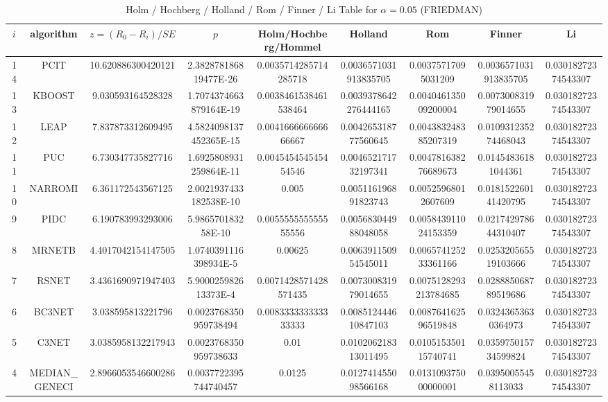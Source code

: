 \documentclass[a4paper,10pt]{article}
\begin{document}
\begin{landscape}
\begin{table}[!htp]
\begin{tabular}{
|r|r|r|r|r|r|r|r|r|r|r|r|r|r|r|r|}
\end{tabular}
\end{table}

\newpage

\begin{table}[!htp]
\centering\scriptsize
\caption{Holm / Hochberg / Holland / Rom / Finner / Li Table for $\alpha=0.05$ (FRIEDMAN)}
\begin{tabular}{ccccccccc}
$i$&algorithm&$z=(R_0 - R_i)/SE$&$p$&Holm/Hochberg/Hommel&Holland&Rom&Finner&Li\\
\hline
14&PCIT&10.620886300420121&2.382878186819477E-26&0.0035714285714285718&0.0036571031913835705&0.00375717095031209&0.0036571031913835705&0.03018272374543307\\
13&KBOOST&9.030593164528328&1.7074374663879164E-19&0.0038461538461538464&0.0039378642276444165&0.004046135009200004&0.007300831979014655&0.03018272374543307\\
12&LEAP&7.837873312609495&4.5824098137452365E-15&0.004166666666666667&0.004265318777560645&0.004383248385207319&0.010931235274468043&0.03018272374543307\\
11&PUC&6.730347735827716&1.6925808931259864E-11&0.004545454545454546&0.004652171732197341&0.004781638276689673&0.01454836181044361&0.03018272374543307\\
10&NARROMI&6.361172543567125&2.0021937433182538E-10&0.005&0.005116196891823743&0.00525968012607609&0.018152260141420795&0.03018272374543307\\
9&PIDC&6.190783993293006&5.986570183258E-10&0.005555555555555556&0.005683044988048058&0.005843911024153359&0.021742978644310407&0.03018272374543307\\
8&MRNETB&4.4017042154147505&1.0740391116398934E-5&0.00625&0.006391150954545011&0.006574125233361166&0.025320565519103666&0.03018272374543307\\
7&RSNET&3.4361690971947403&5.900025982613373E-4&0.0071428571428571435&0.007300831979014655&0.0075128293213784685&0.028885068789519686&0.03018272374543307\\
6&BC3NET&3.038595813221796&0.0023768350959738494&0.008333333333333333&0.008512444610847103&0.008764162596519848&0.03243653630364973&0.03018272374543307\\
5&C3NET&3.0385958132217943&0.0023768350959738633&0.01&0.010206218313011495&0.010515350115740741&0.035975015734599824&0.03018272374543307\\
4&MEDIAN_GENECI&2.8966053546600286&0.0037722395744740457&0.0125&0.012741455098566168&0.013109375000000001&0.03950055458113033&0.03018272374543307\\

\end{tabular}
\end{table}
\end{landscape}
\end{document}
